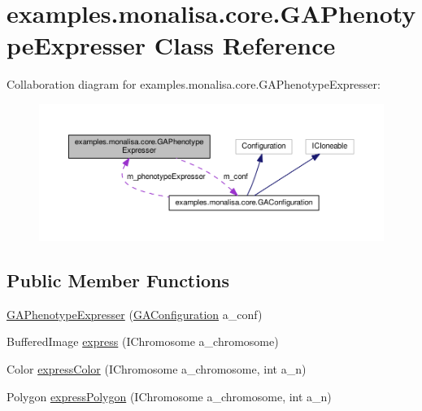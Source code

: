 \hypertarget{classexamples_1_1monalisa_1_1core_1_1_g_a_phenotype_expresser}{\section{examples.\-monalisa.\-core.\-G\-A\-Phenotype\-Expresser Class Reference}
\label{classexamples_1_1monalisa_1_1core_1_1_g_a_phenotype_expresser}
}


Collaboration diagram for examples.\-monalisa.\-core.\-G\-A\-Phenotype\-Expresser\-:
\nopagebreak
\begin{figure}[H]
\begin{center}
\leavevmode
\includegraphics[width=350pt]{classexamples_1_1monalisa_1_1core_1_1_g_a_phenotype_expresser__coll__graph}
\end{center}
\end{figure}
\subsection*{Public Member Functions}
\begin{DoxyCompactItemize}
\item 
\hyperlink{classexamples_1_1monalisa_1_1core_1_1_g_a_phenotype_expresser_ad5ad6b250ceaef258a3c64edfed91ee2}{G\-A\-Phenotype\-Expresser} (\hyperlink{classexamples_1_1monalisa_1_1core_1_1_g_a_configuration}{G\-A\-Configuration} a\-\_\-conf)
\item 
Buffered\-Image \hyperlink{classexamples_1_1monalisa_1_1core_1_1_g_a_phenotype_expresser_a08e23d6c2b0be27b9a38787895505b27}{express} (I\-Chromosome a\-\_\-chromosome)
\item 
Color \hyperlink{classexamples_1_1monalisa_1_1core_1_1_g_a_phenotype_expresser_a03a3c671e044184f7fa7aef68d3f8ba6}{express\-Color} (I\-Chromosome a\-\_\-chromosome, int a\-\_\-n)
\item 
Polygon \hyperlink{classexamples_1_1monalisa_1_1core_1_1_g_a_phenotype_expresser_a8e2fa1f8051007bc7cad53f6edb3cdb4}{express\-Polygon} (I\-Chromosome a\-\_\-chromosome, int a\-\_\-n)
\end{DoxyCompactItemize}
